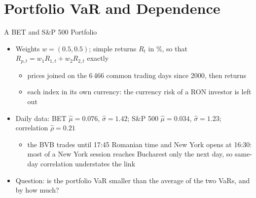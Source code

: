 \section{Portfolio VaR and Dependence}

\begin{frame}{A BET and S\&P 500 Portfolio}
\itemsize{\small}
\begin{itemize}
    \item Weights $w = (0.5, 0.5)$; simple returns $R_t$ in \%, so that $R_{p,t} = w_1R_{1,t} + w_2R_{2,t}$ exactly
    \begin{itemize}
        \item prices joined on the 6\,466 common trading days since 2000, then returns
        \item each index in its own currency: the currency risk of a RON investor is left out
    \end{itemize}
    \item Daily data: BET $\hat\mu = 0.076$, $\hat\sigma = 1.42$; S\&P 500 $\hat\mu = 0.034$, $\hat\sigma = 1.23$; correlation $\hat\rho = 0.21$
    \begin{itemize}
        \item the BVB trades until 17:45 Romanian time and New York opens at 16:30: most of a New York session reaches Bucharest only the next day, so same-day correlation understates the link
    \end{itemize}
    \item Question: is the portfolio VaR smaller than the average of the two VaRs, and by how much?
\end{itemize}
\end{frame}

